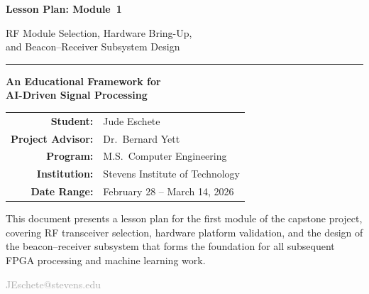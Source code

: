 \documentclass[11pt,letterpaper]{article}
\begin{document}
	
	\begin{titlepage}
		\centering
		\vspace*{2cm}
		
		{\Huge\bfseries\color{stevens} Lesson Plan: Module~1\par}
		\vspace{0.5cm}
		{\LARGE\color{darkgray} RF Module Selection, Hardware Bring-Up,\\[4pt]
			and Beacon--Receiver Subsystem Design\par}
		
		\vspace{1.5cm}
		\rule{0.6\textwidth}{1pt}
		\vspace{1.5cm}
		
		{\Large\textbf{An Educational Framework for\\[4pt]
				AI-Driven Signal Processing}\par}
		
		\vspace{1.5cm}
		
		\begin{tabular}{rl}
			\textbf{Student:}         & Jude Eschete \\
			\textbf{Project Advisor:} & Dr.\ Bernard Yett \\
			\textbf{Program:}         & M.S.\ Computer Engineering \\
			\textbf{Institution:}     & Stevens Institute of Technology \\
			\textbf{Date Range:}      & February 28 -- March 14, 2026 \\
		\end{tabular}
		
		\vspace{2cm}
		
		\begin{tcolorbox}[colback=lightgray, colframe=darkgray, width=0.85\textwidth, arc=2pt]
			\centering\small
			This document presents a lesson plan for the first module of the capstone project,
			covering RF transceiver selection, hardware platform validation, and the design of the
			beacon--receiver subsystem that forms the foundation for all subsequent FPGA processing
			and machine learning work.
		\end{tcolorbox}
		
		\vfill
		{\small\textcolor{darkgray}{JEschete@stevens.edu}}
	\end{titlepage}
	
\end{document}
